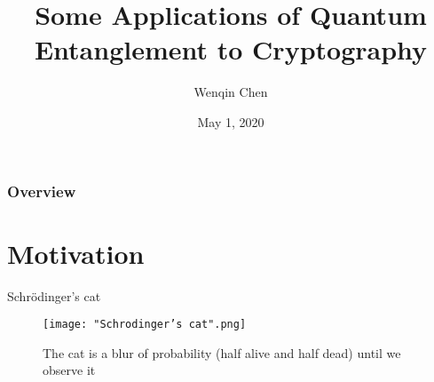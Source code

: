 \documentclass[handout, 10 pt]{beamer}
\title{Some Applications of Quantum Entanglement to Cryptography} %
\author{Wenqin Chen} %
\institute[Smith College] %
{\normalsize{Smith College}\\ %
\smallskip
Thesis Advisors: Dr. David Meyer, Prof. Rajan Mehta
}
\date{May 1, 2020} %
\begin{document}
\begin{frame}
\titlepage %
\end{frame}

\begin{frame}
\frametitle{Overview} %
\tableofcontents %
\end{frame}




\section{Motivation}
\begin{comment}
The Austrian physicist Erwin Schrödinger proposed this thought experiment involving a cat in a sealed box, with a device of a 50\% chance of killing the cat in the next hour. In the classical world, the cat is either alive or dead after 1 hour. However, in the quantum physics, at the instance before the box was open, the cat is equally alive and dead at the same time. it's only when the box is open, we see a single definite state.

The atoms form a world of possibilities rather than one of definite things or facts.
\end{comment}
\begin{frame}{Schrödinger's cat}
\begin{figure}[h]
    \centering
    \texttt{[image: "Schrodinger's cat".png]}
    \caption{The cat is a blur of probability (half alive and half dead) until we observe it}
    \label{fig:Schrödinger's cat}
\end{figure}    
\end{frame}
\end{document}
